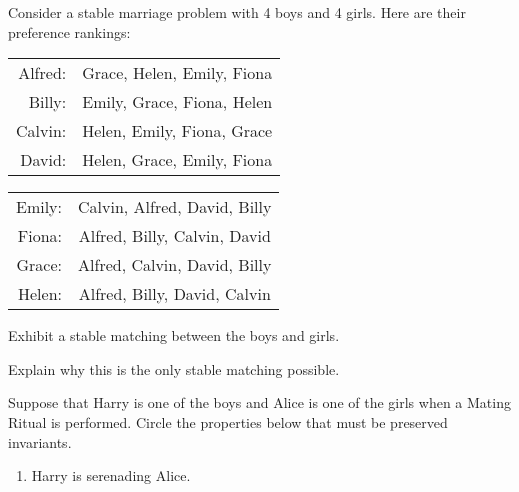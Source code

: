 \documentclass[12pt,oneside]{article}
\begin{document}
\begin{problem}{0}
Consider a stable marriage problem with 4 boys and 4 girls. Here
are their preference rankings:

\begin{center}
\begin{tabular}{r|c} 
Alfred:    & Grace, Helen, Emily, Fiona    \\
Billy:     & Emily, Grace, Fiona, Helen    \\
Calvin:    & Helen, Emily, Fiona, Grace    \\
David:     & Helen, Grace, Emily, Fiona
\end{tabular}
\end{center}

\begin{center}
\begin{tabular}{r|c} 
Emily:     & Calvin, Alfred, David,  Billy    \\
Fiona:     & Alfred, Billy,  Calvin, David    \\
Grace:     & Alfred, Calvin, David,  Billy    \\
Helen:     & Alfred, Billy,  David,  Calvin
\end{tabular}
\end{center}

\bparts

Exhibit a stable matching between the boys and girls.

\vspace{2in}


 Explain why this is the only stable matching possible.

\vspace{2in}

 Suppose that Harry is one of the boys and Alice is one of the girls
when a Mating Ritual is performed.  Circle the properties
below that must be preserved invariants.
\renewcommand{\theenumi}{\roman{enumi}}
\renewcommand{\labelenumi}{(\theenumi)}

\begin{enumerate}

\item Harry is serenading Alice.


\end{enumerate}
\end{problem}
\end{document}
